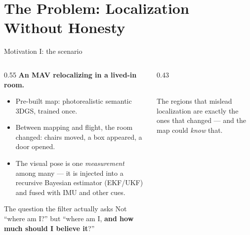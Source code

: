 \documentclass[aspectratio=169,10pt]{beamer}
\newcommand{\good}[1]{{\color{uLow}#1}}
\newcommand{\bad}[1]{{\color{uHigh}#1}}
\begin{document}
\section{The Problem: Localization Without Honesty}

\begin{frame}{Motivation I: the scenario}
  \begin{columns}[T]
    \begin{column}{0.55\textwidth}
      \textbf{An MAV relocalizing in a lived-in room.}
      \begin{itemize}
        \item Pre-built map: photorealistic semantic 3DGS, trained once.
        \item Between mapping and flight, the room \alert{changed}: chairs
              moved, a box appeared, a door opened.
        \item The visual pose is one \emph{measurement} among many --- it is
              injected into a recursive Bayesian estimator (EKF/UKF) and
              fused with IMU and other cues.
      \end{itemize}
      \vspace{1mm}
      \begin{block}{The question the filter actually asks}
        Not ``where am I?'' but
        ``where am I, \textbf{and how much should I believe it}?''
      \end{block}
    \end{column}
    \begin{column}{0.43\textwidth}
      \centering
      \\[2mm]
      \small The regions that mislead localization are exactly the ones that
      changed --- and the map could \emph{know} that.
    \end{column}
  \end{columns}
\end{frame}
\end{document}
